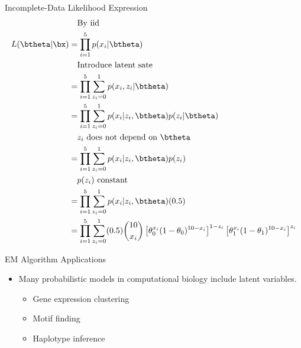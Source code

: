 \documentclass[dvipdfmx,bigger,aspectratio=169]{beamer}
\begin{document}
\begin{frame}[label={sec:orgce048f1}]{Incomplete-Data Likelihood Expression}
\begin{align*}
  &~~~\text{By iid}\\
  L(\btheta | \bx)
  &= \prod^{5}_{i=1}p(x_{i} | \btheta)\\
  &~~~\text{Introduce latent sate}\\
  &= \prod^{5}_{i=1} \sum^{1}_{z_{i}=0} p(x_{i}, z_{i} | \btheta)\\
  &= \prod^{5}_{i=1} \sum^{1}_{z_{i}=0} p(x_{i} | z_{i}, \btheta) p(z_{i} | \btheta)\\
  &~~~\text{$z_{i}$ does not depend on $\btheta$}\\
  &= \prod^{5}_{i=1} \sum^{1}_{z_{i}=0} p(x_{i} | z_{i}, \btheta) p(z_{i})\\
  &~~~\text{$p(z_{i})$ constant}\\
  &= \prod^{5}_{i=1} \sum^{1}_{z_{i}=0} p(x_{i} | z_{i}, \btheta) (0.5)\\
  &= \prod^{5}_{i=1} \sum^{1}_{z_{i}=0}
    (0.5) \binom{10}{x_{i}}
    \left[ \theta_{0}^{x_{i}}(1-\theta_{0})^{10-x_{i}} \right]^{1-z_{i}}
    \left[ \theta_{1}^{x_{i}}(1-\theta_{1})^{10-x_{i}} \right]^{z_{i}}\\
\end{align*}
\end{frame}


\begin{frame}[label={sec:orga36aa40}]{EM Algorithm Applications}
\begin{itemize}
\item Many probabilistic models in computational biology include latent variables. \cite{doWhatExpectationMaximization2008}
\begin{itemize}
\item Gene expression clustering
\item Motif finding
\item Haplotype inference
\end{itemize}
\end{itemize}
\end{frame}
\end{document}
